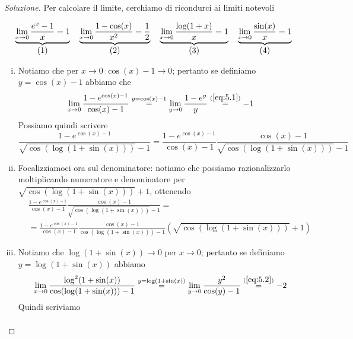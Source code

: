 \begin{proof}[Soluzione]
    Per calcolare il limite, cerchiamo di ricondurci ai limiti notevoli
    \begin{tcolorbox}
        \[
        \underbrace{\lim_{x\to 0} \frac{e^x-1}{x} = 1}_{\stepcounter{equation}\mbox{(\theequation)}} \quad \underbrace{\lim_{x\to 0} \frac{1-\cos(x)}{x^2} = \frac{1}{2}}_{\stepcounter{equation}\mbox{(\theequation)}} \quad \underbrace{\lim_{x\to 0} \frac{\log(1+x)}{x} = 1}_{\stepcounter{equation}\mbox{(\theequation)}}
        \quad \underbrace{\lim_{x\to 0}  \frac{\sin(x)}{x} = 1}_{\stepcounter{equation}\mbox{(\theequation)}}
        \]
        \addtocounter{equation}{-4}\label{eq:5.1}
        \addtocounter{equation}{0}\label{eq:5.2}
        \addtocounter{equation}{0}\label{eq:5.3}
        \addtocounter{equation}{0}\label{eq:5.4}
    \end{tcolorbox}
    \begin{enumerate}[(i)]
        \item Notiamo che per $x\to 0$ $\cos(x)-1\to 0$; pertanto se definiamo $y=\cos(x)-1$ abbiamo che
        \[
        \lim_{x\to 0}\frac{1-e^{\cos(x)-1}}{\cos(x)-1} \overset{y=\cos(x)-1}{=} \lim_{y\to 0} \frac{1-e^y}{y} \overset{(\ref{eq:5.1})}{=} -1
        \]
        Possiamo quindi scrivere
        \[
        \frac{1-e^{\cos(x)-1}}{\sqrt{\cos(\log(1+\sin(x)))}-1} = \frac{1-e^{\cos(x)-1}}{\cos(x)-1}\frac{\cos(x)-1}{\sqrt{\cos(\log(1+\sin(x)))}-1}
        \]
        \item Focalizziamoci ora sul denominatore: notiamo che possiamo razionalizzarlo moltiplicando numeratore e denominatore per $\sqrt{\cos(\log(1+\sin(x)))}+1$, ottenendo
        \[
        \begin{split}
            & \frac{1-e^{\cos(x)-1}}{\cos(x)-1}\frac{\cos(x)-1}{\sqrt{\cos(\log(1+\sin(x)))}-1} = \\
            & = \frac{1-e^{\cos(x)-1}}{\cos(x)-1}\frac{\cos(x)-1}{{\cos(\log(1+\sin(x)))}-1}(\sqrt{\cos(\log(1+\sin(x)))}+1)
        \end{split}
        \]
        \item Notiamo che $\log(1+\sin(x))\to 0$ per $x\to 0$; pertanto se definiamo $y=\log(1+\sin(x))$ abbiamo
        \[
        \lim_{x\to 0} \frac{\log^2(1+\sin(x))}{\cos(\log(1+\sin(x)))-1} \overset{y=\log(1+\sin(x))}{=} \lim_{y\to 0} \frac{y^2}{\cos(y)-1} \overset{(\ref{eq:5.2})}{=} -2
        \]
        Quindi scriviamo
        \[
        \begin{split}

\end{split}\]
\end{enumerate}
\end{proof}
